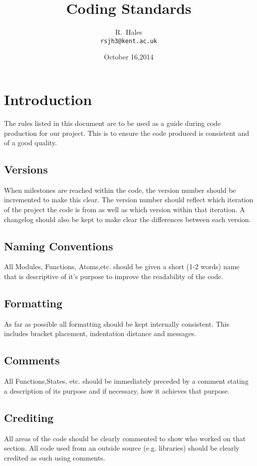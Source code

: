 \documentclass[a4paper,12pt]{article}
\begin{document}
\title{Coding Standards}
\author{R.~Hales\\{\small\tt rsjh3@kent.ac.uk}}
\date{October 16,2014}

\maketitle

\section{Introduction}
The rules listed in this document are to be used as a guide during code production for our project. This is to ensure the code produced is consistent and of a good quality.

\subsection{Versions}
When milestones are reached within the code, the version number should be incremented to make this clear. The version number should reflect which iteration of the project the code is from as well as which version within that iteration. A changelog should also be kept to make clear the differences between each version.
\subsection{Naming Conventions}
All Modules, Functions, Atoms,etc. should be given a short (1-2 words) name that is descriptive of it's purpose to improve the readability of the code.
\subsection{Formatting}
As far as possible all formatting should be kept internally consistent. This includes bracket placement, indentation distance and messages.\subsection{Comments}
All Functions,States, etc. should be immediately preceded by a comment stating a description of its purpose and if necessary, how it achieves that purpose.
\subsection{Crediting}
All areas of the code should be clearly commented to show who worked on that section.
All code used from an outside source (e.g. libraries) should be clearly credited as such  using comments.
\end{document}
